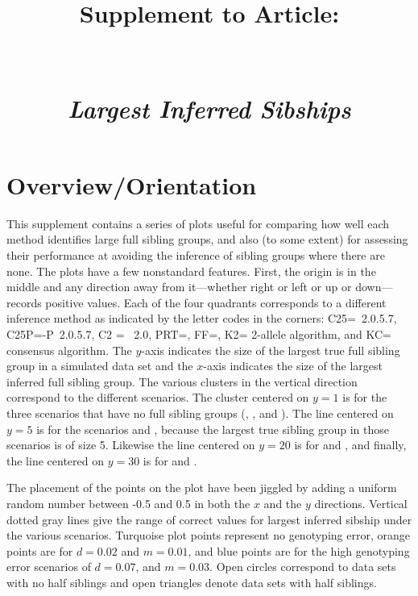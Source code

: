 \documentclass[11pt,landscape]{report}
\title{Supplement \SupNum{} to Article:\\
\ArticleName\\
\mbox{}\\
{\em Largest Inferred Sibships}}
\begin{document}
\maketitle
\section{Overview/Orientation}
This supplement contains a series of plots useful for comparing how well each method identifies large full sibling groups, and also (to some extent) for assessing their performance at avoiding the inference of sibling groups where there are none.  The plots have a few nonstandard features.  First, the origin is in the middle and any direction away from it---whether right or left or up or down---records positive values.  Each of the four quadrants corresponds to a different inference method as indicated by the letter codes in the corners: C25=\colony{}~2.0.5.7, C25P=\colony{}-P~2.0.5.7, C2 = \colony~2.0, PRT=\prt{}, FF=\familyfinder, K2=\kinalyzer{} 2-allele algorithm, and KC=\kinalyzer{} consensus algorithm.  The $y$-axis indicates the size of the largest true full sibling group in a simulated data set and the $x$-axis indicates the size of the largest inferred full sibling group.  The various clusters in the vertical direction correspond to the different scenarios.  The cluster centered on $y=1$ is for the three scenarios that have no full sibling groups (\nosibs{}, \allhalf{}, and \allpathalf{}).  The line centered on $y=5$ is for the scenarios \sfswh{} and \sfsnoh{}, because the largest true sibling group in those scenarios is of size 5.  Likewise the line centered on $y=20$ is for \slfsgnoh{} and \slfsgwh{}, and finally, the line centered on $y=30$ is for \onelargenoh{} and \onelargewh{}.  

The placement of the points on the plot have been jiggled by adding a uniform random number between -0.5 and 0.5 in both the $x$ and the $y$ directions.  Vertical dotted gray lines give the range of correct values for largest inferred sibship under the various scenarios.  Turquoise plot points represent no genotyping error, orange points are for $d=0.02$ and $m=0.01$, and blue points are for the high genotyping error scenarios of $d=0.07$, and $m=0.03$.  Open circles correspond to data sets with no half siblings and open triangles denote data sets with half siblings.
\end{document}
